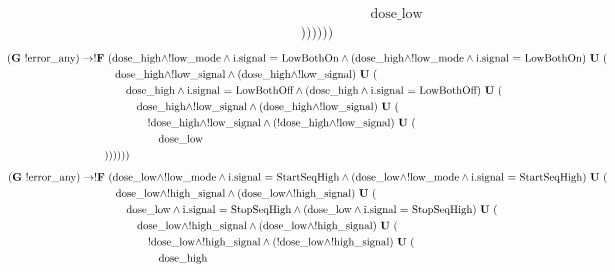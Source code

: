 \documentclass[a4paper,10pt]{article}
\newcommand{\LTLG}{\mathbf{G~}}
\newcommand{\LTLF}{\mathbf{F~}}
\newcommand{\LTLU}{\mathbf{~U~}}
\newcommand{\imply}{\rightarrow}
\newcommand{\doselow}{\textrm{dose\_low}}
\newcommand{\dosehigh}{\textrm{dose\_high}}
\newcommand{\lowsignal}{\textrm{low\_signal}}
\newcommand{\highsignal}{\textrm{high\_signal}}
\newcommand{\errorany}{\textrm{error\_any}}
\newcommand{\lowmode}{\textrm{low\_mode}}
\begin{document}
\begin{enumerate}
\begin{align*}
				&					\hspace{5em}\doselow \\
				&))))))
			\end{align*}
			\begin{align*}
				&\hspace{-9em}(\LTLG !\errorany) \imply !\LTLF (\dosehigh \land !\lowmode \land \textrm{i.signal = LowBothOn} \land (\dosehigh \land !\lowmode \land \textrm{i.signal = LowBothOn}) \LTLU ( \\
				&	\hspace{1em}\dosehigh \land !\lowsignal \land (\dosehigh \land !\lowsignal) \LTLU ( \\
				&		\hspace{2em}\dosehigh \land \textrm{i.signal = LowBothOff} \land (\dosehigh \land \textrm{i.signal = LowBothOff}) \LTLU ( \\
				&			\hspace{3em}\dosehigh \land !\lowsignal \land (\dosehigh \land !\lowsignal) \LTLU ( \\
				&				\hspace{4em}!\dosehigh \land !\lowsignal \land (!\dosehigh \land !\lowsignal) \LTLU ( \\
				&					\hspace{5em}\doselow \\
				&))))))
			\end{align*}
			\begin{align*}
				&\hspace{-9em}(\LTLG !\errorany) \imply !\LTLF (\doselow \land !\lowmode \land \textrm{i.signal = StartSeqHigh} \land (\doselow \land !\lowmode \land \textrm{i.signal = StartSeqHigh}) \LTLU ( \\
				&	\hspace{1em}\doselow \land !\highsignal \land (\doselow \land !\highsignal) \LTLU ( \\
				&		\hspace{2em}\doselow \land \textrm{i.signal = StopSeqHigh} \land (\doselow \land \textrm{i.signal = StopSeqHigh}) \LTLU ( \\
				&			\hspace{3em}\doselow \land !\highsignal \land (\doselow \land !\highsignal) \LTLU ( \\
				&				\hspace{4em}!\doselow \land !\highsignal \land (!\doselow \land !\highsignal) \LTLU ( \\
				&					\hspace{5em}\dosehigh \\

\end{align*}
\end{enumerate}
\end{document}
